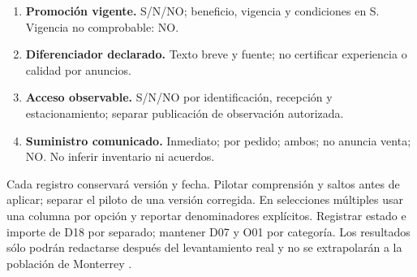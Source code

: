 {\begin{enumerate}
\item[O13.] \textbf{Promoción vigente.} S/N/NO; beneficio, vigencia y condiciones en S. Vigencia no comprobable: NO.
\item[O14.] \textbf{Diferenciador declarado.} Texto breve y fuente; no certificar experiencia o calidad por anuncios.
\item[O15.] \textbf{Acceso observable.} S/N/NO por identificación, recepción y estacionamiento; separar publicación de observación autorizada.
\item[O16.] \textbf{Suministro comunicado.} Inmediato; por pedido; ambos; no anuncia venta; NO. No inferir inventario ni acuerdos.
\end{enumerate}
Cada registro conservará versión y fecha. Pilotar comprensión y saltos antes de aplicar; separar el piloto de una versión corregida. En selecciones múltiples usar una columna por opción y reportar denominadores explícitos. Registrar estado e importe de D18 por separado; mantener D07 y O01 por categoría. Los resultados sólo podrán redactarse después del levantamiento real y no se extrapolarán a la población de Monterrey \citep{albrechtMarketing2023}.
}
